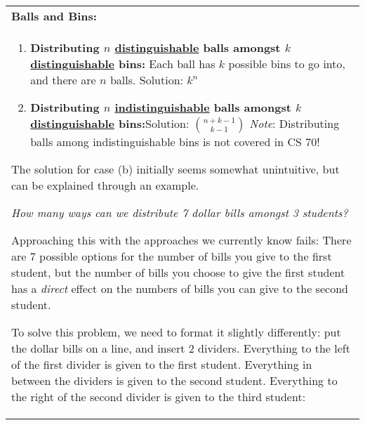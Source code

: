 {\tabulinesep=1mm
\begin{tabu}{|p{16cm} |}
\hline
\textbf{Balls and Bins:} \\
\begin{enumerate}[label=\alph*.]
\item \textbf{Distributing $n$ \underline{distinguishable} balls amongst $k$ \underline{distinguishable} bins:} Each ball has $k$ possible bins to go into, and there are $n$ balls. Solution: $k^{n}$ 
\item \textbf{Distributing $n$ \underline{indistinguishable} balls amongst $k$ \underline{distinguishable} bins:}Solution: ${n+k-1 \choose k-1}$ \newline
\textit{Note}: Distributing balls among indistinguishable bins is not covered in CS 70! \newline
\end{enumerate}

The solution for case (b) initially seems somewhat unintuitive, but can be explained through an example. \newline

\textit{How many ways can we distribute 7 dollar bills amongst 3 students?} \newline

Approaching this with the approaches we currently know fails: There are 7 possible options for the number of bills you give to the first student, but the number of bills you choose to give the first student has a \textit{direct} effect on the numbers of bills you can give to the second student. %
\newline

To solve this problem, we need to format it slightly differently: put the dollar bills on a line, and insert 2 dividers. Everything to the left of the first divider is given to the first student. Everything in between the dividers is given to the second student. Everything to the right of the second divider is given to the third student: \newline 


\end{tabu}}
